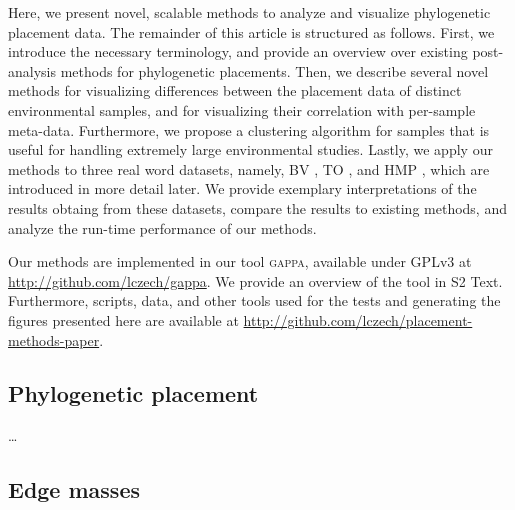 \documentclass[10pt,letterpaper]{article}
\newcommand\toolname{\textsc}
\begin{document}
Here, we present novel, scalable methods to analyze and visualize phylogenetic placement data.
The remainder of this article is structured as follows.
First, we introduce the necessary terminology,
and provide an overview over existing post-analysis methods for phylogenetic placements.
Then, we describe several novel methods for visualizing differences between the placement data of distinct environmental samples,
and for visualizing their correlation with per-sample meta-data.
Furthermore, we propose a clustering algorithm for samples that is useful for handling extremely large environmental studies.
Lastly, we apply our methods to three real word datasets,
namely, \acf{BV} \cite{Srinivasan2012}, \acf{TO} \cite{Karsenti2011,Sunagawa2015,Guidi2016}, and \acf{HMP} \cite{Huttenhower2012,Methe2012},
which are introduced in more detail later.
We provide exemplary interpretations of the results obtaing from these datasets,
compare the results to existing methods, and analyze the run-time performance of our methods.

Our methods are implemented in our tool \toolname{gappa},
available under GPLv3 at \url{http://github.com/lczech/gappa}.
We provide an overview of the tool in S2 Text. %
Furthermore, scripts, data, and other tools used for the tests and generating the figures presented here
are available at \url{http://github.com/lczech/placement-methods-paper}.


\subsection*{Phylogenetic placement}
\label{sec:Introduction:sub:PhylogeneticPlacement}

\ldots


\subsection*{Edge masses}
\label{sec:Introduction:sub:Masses}
\end{document}
